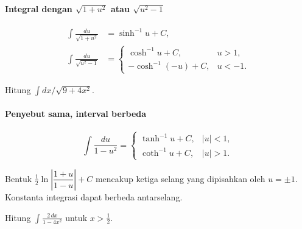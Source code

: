 \documentclass{../../kalkulus-ppt}
\begin{document}
\begin{frame}{\insertsection}
    \framesubtitle{Integral dengan $\sqrt{1+u^2}$ atau $\sqrt{u^2-1}$}
    \begin{teorema}
        \[
            \begin{aligned}
                \int\frac{du}{\sqrt{1+u^2}}&=\sinh^{-1}u+C,\\
                \int\frac{du}{\sqrt{u^2-1}}
                    &=\begin{cases}
                        \cosh^{-1}u+C,&u>1,\\
                        -\cosh^{-1}(-u)+C,&u<-1.
                    \end{cases}
            \end{aligned}
        \]
    \end{teorema}
    \begin{contoh}
        Hitung $\int dx/\sqrt{9+4x^2}$.
    \end{contoh}
\end{frame}

\begin{frame}{\insertsection}
    \framesubtitle{Penyebut sama, interval berbeda}
    \begin{teorema}
        \[
            \int\frac{du}{1-u^2}=
            \begin{cases}
                \tanh^{-1}u+C,& |u|<1,\\
                \coth^{-1}u+C,& |u|>1.
            \end{cases}
        \]
    \end{teorema}
    Bentuk $\tfrac12\ln\left|\dfrac{1+u}{1-u}\right|+C$ mencakup ketiga selang
    yang dipisahkan oleh $u=\pm1$. Konstanta integrasi dapat berbeda antarselang.
    \begin{contoh}
        Hitung $\displaystyle\int\frac{2\,dx}{1-4x^2}$ untuk $x>\tfrac12$.
    \end{contoh}
\end{frame}
\end{document}
